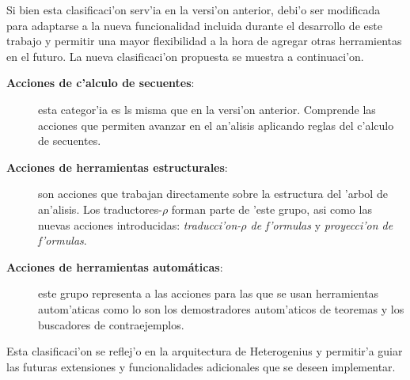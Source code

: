 Si bien esta clasificaci'on serv'ia en la versi'on anterior, debi'o ser modificada para adaptarse a la nueva funcionalidad incluida durante el desarrollo de este trabajo y permitir una mayor flexibilidad a la hora de agregar otras herramientas en el futuro.
La nueva clasificaci'on propuesta se muestra a continuaci'on.

\begin{description}
\item[\textbf{Acciones de c'alculo de secuentes}:] esta categor'ia es ls misma que en la versi'on anterior. Comprende las acciones que permiten avanzar en el an'alisis aplicando reglas del c'alculo de secuentes.

\item[\textbf{Acciones de herramientas estructurales}:] son acciones que trabajan directamente sobre la estructura del 'arbol de an'alisis. Los traductores-$\rho$ forman parte de 'este grupo, asi como las nuevas acciones introducidas: \textit{traducci'on-$\rho$ de f'ormulas} y \textit{proyecci'on de f'ormulas}.

\item[\textbf{Acciones de herramientas automáticas}:] este grupo representa a las acciones para las que se usan herramientas autom'aticas como lo son los demostradores autom'aticos de teoremas y los buscadores de contraejemplos.
\end{description}

Esta clasificaci'on se reflej'o en la arquitectura de Heterogenius y permitir'a guiar las futuras extensiones y funcionalidades adicionales que se deseen implementar.
